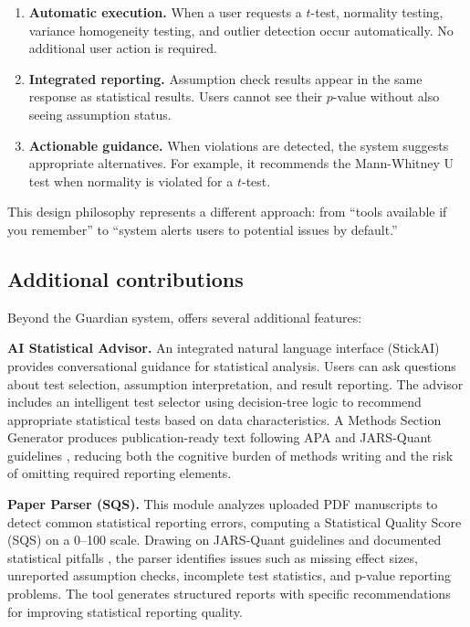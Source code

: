 \documentclass[article]{jss}
\begin{document}
\begin{enumerate}
\item \textbf{Automatic execution.} When a user requests a $t$-test, normality testing, variance homogeneity testing, and outlier detection occur automatically. No additional user action is required.
\item \textbf{Integrated reporting.} Assumption check results appear in the same response as statistical results. Users cannot see their $p$-value without also seeing assumption status.
\item \textbf{Actionable guidance.} When violations are detected, the system suggests appropriate alternatives. For example, it recommends the Mann-Whitney U test when normality is violated for a $t$-test.
\end{enumerate}

This design philosophy represents a different approach: from ``tools available if you remember'' to ``system alerts users to potential issues by default.''

\subsection{Additional contributions}

Beyond the Guardian system,  offers several additional features:

\textbf{AI Statistical Advisor.} An integrated natural language interface (StickAI) provides conversational guidance for statistical analysis. Users can ask questions about test selection, assumption interpretation, and result reporting. The advisor includes an intelligent test selector using decision-tree logic to recommend appropriate statistical tests based on data characteristics. A Methods Section Generator produces publication-ready text following APA and JARS-Quant guidelines \citep{appelbaum2018jars}, reducing both the cognitive burden of methods writing and the risk of omitting required reporting elements.

\textbf{Paper Parser (SQS).} This module analyzes uploaded PDF manuscripts to detect common statistical reporting errors, computing a Statistical Quality Score (SQS) on a 0--100 scale. Drawing on JARS-Quant guidelines and documented statistical pitfalls \citep{appelbaum2018jars, keselman1998statistical}, the parser identifies issues such as missing effect sizes, unreported assumption checks, incomplete test statistics, and p-value reporting problems. The tool generates structured reports with specific recommendations for improving statistical reporting quality.
\end{document}
